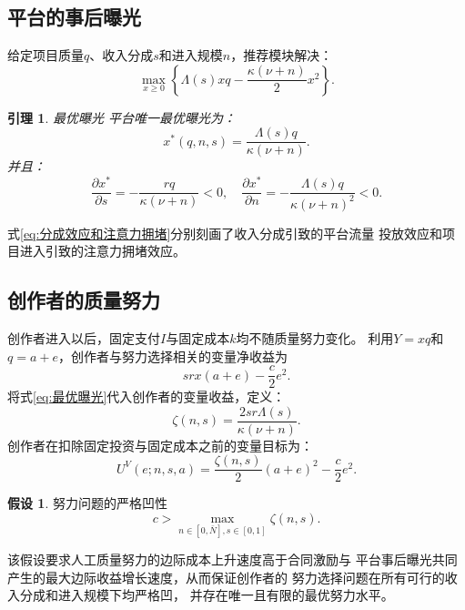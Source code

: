\documentclass[UTF8, a4paper, 12pt, fontset=fandol]{ctexart}
\newtheorem{lemma}[theorem]{引理}
\theoremstyle{definition}
\newtheorem{assumption}{假设}[section]
\theoremstyle{remark}
\begin{document}
\subsection{平台的事后曝光}
给定项目质量$q$、收入分成$s$和进入规模$n$，推荐模块解决：
\begin{equation*}
  \max_{x\ge 0} \left \{ \Lambda(s)xq-\frac{\kappa(\nu + n)}{2}x^2 \right \}.
\end{equation*}
\begin{lemma}{最优曝光}
  平台唯一最优曝光为：
  \begin{equation}
    x^*(q,n,s) = \frac{\Lambda(s)q}{\kappa(\nu+n)}.
    \label{eq:最优曝光}
  \end{equation}
  并且：
  \begin{equation}
    \frac{\partial x^*}{\partial s} = -\frac{rq}{\kappa(\nu + n)}<0,
    \quad
    \frac{\partial x^*}{\partial n} = -\frac{\Lambda(s)q}{\kappa(\nu+n)^2}<0.
    \label{eq:分成效应和注意力拥堵}
  \end{equation}
\end{lemma}
式\eqref{eq:分成效应和注意力拥堵}分别刻画了收入分成引致的平台流量
投放效应和项目进入引致的注意力拥堵效应。
\subsection{创作者的质量努力}
创作者进入以后，固定支付$I$与固定成本$k$均不随质量努力变化。
利用$Y=xq$和$q = a+e$，创作者与努力选择相关的变量净收益为
\begin{equation*}
  srx(a+e)-\frac{c}{2}e^2.
\end{equation*}
将式\eqref{eq:最优曝光}代入创作者的变量收益，定义：
\begin{equation}
  \zeta(n,s)=\frac{2sr\Lambda(s)}{\kappa(\nu+n)}.
\end{equation}
创作者在扣除固定投资与固定成本之前的变量目标为：
\begin{equation*}
  U^V(e;n,s,a)=\frac{\zeta(n,s)}{2}(a+e)^2-\frac{c}{2}e^2.
\end{equation*}
\begin{assumption}{努力问题的严格凹性}
  \label{ass:努力问题的严格凹性}
  \begin{equation*}
    c > \max_{n\in[0,\bar N],s\in [0,1]}\zeta(n,s).
  \end{equation*}
\end{assumption}
该假设要求人工质量努力的边际成本上升速度高于合同激励与
平台事后曝光共同产生的最大边际收益增长速度，从而保证创作者的
努力选择问题在所有可行的收入分成和进入规模下均严格凹，
并存在唯一且有限的最优努力水平。
\end{document}

